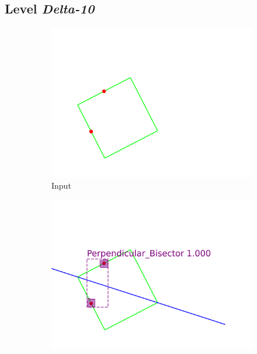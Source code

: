 \subsection{Level \textit{Delta-10}}
\begin{figure}[!htb]
     \centering
     \begin{subfigure}[t]{0.32\textwidth}
         \centering
         \includegraphics[width=\textwidth]{img/Delta-10_example/input_image0.png}
         \caption{Input}
         \label{fig:Epsilo12_example_input}
     \end{subfigure}
     \hfill
     \begin{subfigure}[t]{0.32\textwidth}
         \centering
         \includegraphics[width=\textwidth]{img/Delta-10_example/output_image0.png}

\end{subfigure}
\end{figure}
